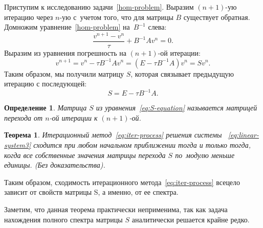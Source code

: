 \documentclass[11pt,a4paper,twoside,listtotoc,bibtotoc]{report}
\numberwithin{equation}{section}
\newtheorem*{definition}{Определение}
\theoremstyle{definition}
\theoremstyle{plain}
\newtheorem{theorem}{Теорема}[section]
\begin{document}
Приступим к исследованию задачи~\eqref{hom-problem}.
Выразим $(n+1)$-ую итерацию через $n$-ую с~учетом того, что для матрицы $B$
существует обратная.
Домножим уравнение~\eqref{hom-problem} на~$B^{-1}$ слева:
%
$$
    \frac{v^{n+1} - v^n}{\tau} + B^{-1}Av^n = 0.
$$
%
Выразим из уравнения погрешность на $(n+1)$-ой итерации:
%
$$
    v^{n+1} = v^n - {\tau}B^{-1}Av^n = (E - {\tau}B^{-1}A)v^n = Sv^n.
$$
%
Таким образом, мы получили матрицу $S$, которая связывает предыдущую
итерацию с последующей:
%
\begin{equation}
    \label{eq:S-equation}
    S = E - {\tau}B^{-1}A.
\end{equation}
%
%
\begin{definition}
    Матрица $S$ из уравнения~\eqref{eq:S-equation} называется
    матрицей перехода от $n$-ой итерации к $(n+1)$-ой.
\end{definition}
%
%
\begin{theorem}
    \label{thm:theorem1}
    Итерационный метод~\eqref{eq:iter-process} решения системы
   ~\eqref{eq:linear-system3} сходится при любом начальном приближении тогда и
    только тогда, когда все собственные значения матрицы перехода $S$
    по~модулю меньше единицы. (Без доказательства).
\end{theorem}
%

Таким образом, сходимость итерационного метода~\eqref{eq:iter-process}
всецело зависит от свойств матрицы S, а именно, от ее спектра.

Заметим, что данная теорема практически неприменима, так как задача нахождения
полного спектра матрицы $S$ аналитически решается крайне редко.
\end{document}
